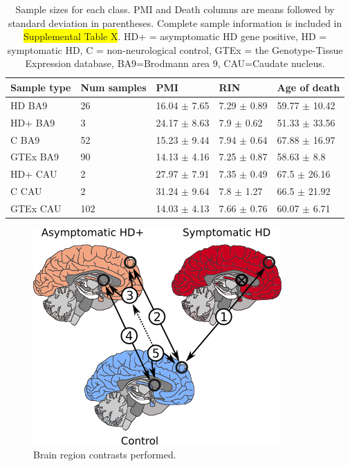 \documentclass[fleqn,10pt,table]{wlscirep}
\newcommand{\todo}[1]{\colorbox{yellow}{#1}}
\begin{document}
\begin{table}  [ht]
\centering
{}
\begin{tabular}{|l|l|l|l|l|} \hline
Sample type & Num samples & PMI & RIN & Age of death \\ \hline
HD BA9 & 26 & 16.04 $\pm$ 7.65 & 7.29 $\pm$ 0.89 & 59.77 $\pm$ 10.42 \\ \hline
HD+ BA9 & 3 & 24.17 $\pm$ 8.63 & 7.9 $\pm$ 0.62 & 51.33 $\pm$ 33.56 \\ \hline
C BA9 & 52 & 15.23 $\pm$ 9.44 & 7.94 $\pm$ 0.64 & 67.88 $\pm$ 16.97 \\ \hline
GTEx BA9 & 90 & 14.13 $\pm$ 4.16 & 7.25 $\pm$ 0.87 & 58.63 $\pm$ 8.8 \\ \hline
HD+ CAU & 2 & 27.97 $\pm$ 7.91 & 7.35 $\pm$ 0.49 & 67.5 $\pm$ 26.16 \\ \hline
C CAU & 2 & 31.24 $\pm$ 9.64 & 7.8 $\pm$ 1.27 & 66.5 $\pm$ 21.92 \\ \hline
GTEx CAU & 102 & 14.03 $\pm$ 4.13 & 7.66 $\pm$ 0.76 & 60.07 $\pm$ 6.71 \\ \hline
\end{tabular}
\caption{Sample sizes for each class. PMI and Death columns are means followed by standard deviation in parentheses. Complete sample information is included in \todo{Supplemental Table X}. HD+ = asymptomatic HD gene positive, HD = symptomatic HD, C = non-neurological control, GTEx = the Genotype-Tissue Expression database, BA9=Brodmann area 9, CAU=Caudate nucleus.\label{tab:samples}}
\end{table}

\begin{figure}[ht]
\centering
\includegraphics[width=0.5\linewidth]{asymp_figure_1.png}
\caption{Brain region contrasts performed. \label{fig:contrasts}}
\end{figure}
\end{document}
